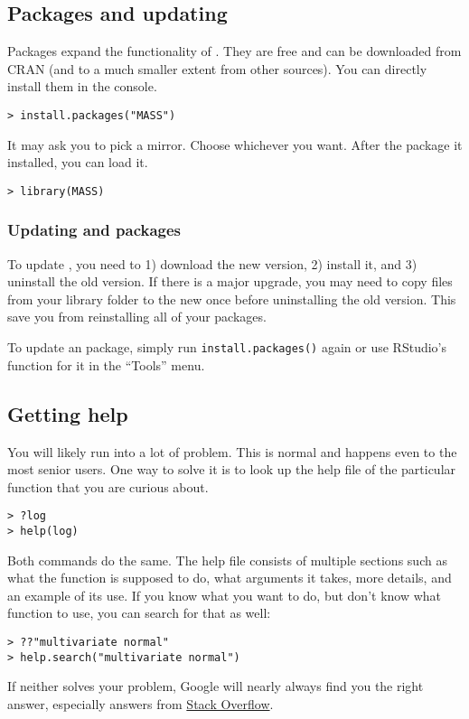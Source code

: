 \subsection{Packages and updating}

Packages expand the functionality of \R. They are free and can be downloaded from CRAN (and to a much smaller extent from other sources). You can directly install them in the console. 

\begin{lstlisting}
> install.packages("MASS")
\end{lstlisting}

It may ask you to pick a mirror. Choose whichever you want. After the package it installed, you can load it.

\begin{lstlisting}
> library(MASS)
\end{lstlisting}

\subsubsection*{Updating \R and \R packages}

To update \R, you need to 1) download the new version, 2) install it, and 3) uninstall the old version. If there is a major upgrade, you may need to copy files from your library folder to the new once before uninstalling the old version. This save you from reinstalling all of your packages.

To update an \R package, simply run \verb|install.packages()| again or use RStudio's function for it in the ``Tools'' menu.

\subsection{Getting help}

You will likely run into a lot of problem. This is normal and happens even to the most senior \R users. One way to solve it is to look up the \R help file of the particular function that you are curious about.

\begin{lstlisting}
> ?log
> help(log)
\end{lstlisting}

Both commands do the same. The help file consists of multiple sections such as what the function is supposed to do, what arguments it takes, more details, and an example of its use. If you know what you want to do, but don't know what function to use, you can search for that as well:

\begin{lstlisting}
> ??"multivariate normal"
> help.search("multivariate normal")
\end{lstlisting}

If neither solves your problem, Google will nearly always find you the right answer, especially answers from \href{htpp://www.stackoverflow.com}{Stack Overflow}.




